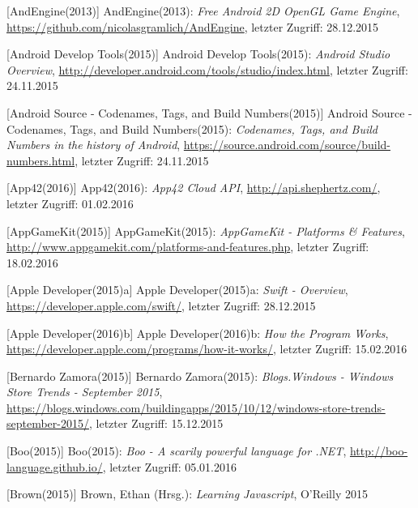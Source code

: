 \begin{thebibliography}{}
	
[AndEngine(2013)] AndEngine(2013): \emph{Free Android 2D OpenGL Game Engine},
\url{https://github.com/nicolasgramlich/AndEngine}, letzter Zugriff: 28.12.2015

[Android Develop Tools(2015)] Android Develop Tools(2015): \emph{Android Studio Overview},
\url{http://developer.android.com/tools/studio/index.html}, letzter Zugriff: 24.11.2015

[Android Source - Codenames, Tags, and Build Numbers(2015)] Android Source - Codenames, Tags, and Build Numbers(2015):
\emph{Codenames, Tags, and Build Numbers in the history of Android},
\url{https://source.android.com/source/build-numbers.html}, letzter Zugriff: 24.11.2015

[App42(2016)] App42(2016): \emph{App42 Cloud API},
\url{http://api.shephertz.com/}, letzter Zugriff: 01.02.2016

[AppGameKit(2015)] AppGameKit(2015): \emph{AppGameKit - Platforms \& Features},
\url{http://www.appgamekit.com/platforms-and-features.php}, letzter Zugriff: 18.02.2016

[Apple Developer(2015)a] Apple Developer(2015)a: \emph{Swift - Overview},
\url{https://developer.apple.com/swift/}, letzter Zugriff: 28.12.2015

[Apple Developer(2016)b] Apple Developer(2016)b: \emph{How the Program Works},
\url{https://developer.apple.com/programs/how-it-works/}, letzter Zugriff: 15.02.2016

[Bernardo Zamora(2015)] Bernardo Zamora(2015): \emph{Blogs.Windows - Windows Store Trends - September 2015},
\url{https://blogs.windows.com/buildingapps/2015/10/12/windows-store-trends-september-2015/}, letzter Zugriff: 15.12.2015

[Boo(2015)] Boo(2015): \emph{Boo - A scarily powerful language for .NET},
\url{http://boo-language.github.io/}, letzter Zugriff: 05.01.2016

[Brown(2015)] Brown, Ethan (Hrsg.): 
\emph{Learning Javascript}, O'Reilly 2015


\end{thebibliography}
